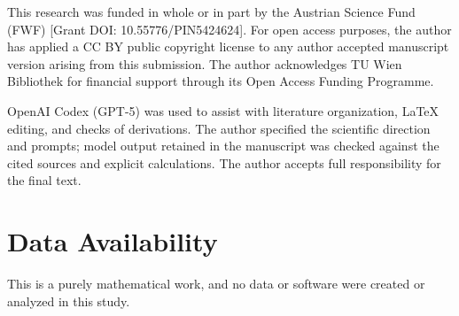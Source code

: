 \documentclass[aps,pra,reprint,superscriptaddress,amsmath,amssymb,floatfix]{revtex4-2}
\theoremstyle{plain}
\theoremstyle{definition}
\theoremstyle{remark}
\begin{document}
\begin{acknowledgments}
This research was funded in whole or in part by the Austrian Science Fund
(FWF) [Grant DOI: 10.55776/PIN5424624]. For open access purposes, the author
has applied a CC BY public copyright license to any author accepted manuscript
version arising from this submission. The author acknowledges TU Wien
Bibliothek for financial support through its Open Access Funding Programme.

OpenAI Codex (GPT-5) was used to assist with literature organization, LaTeX
editing, and checks of derivations. The author specified the scientific
direction and prompts; model output retained in the manuscript was checked
against the cited sources and explicit calculations. The author accepts full
responsibility for the final text.
\end{acknowledgments}

\section*{Data Availability}
This is a purely mathematical work, and no data or software were created or
analyzed in this study.

\clearpage

\end{document}
